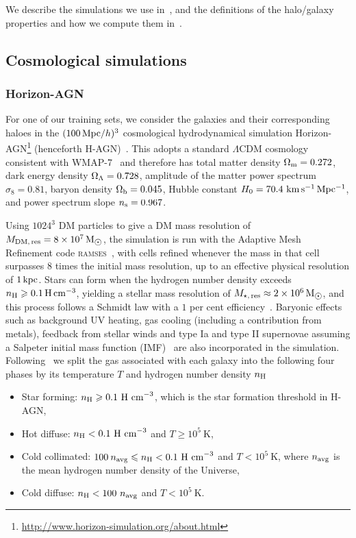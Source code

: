\documentclass[usenatbib,useAMS]{mnras}
\begin{document}
We describe the simulations we use in~, and the definitions of the halo/galaxy properties and how we compute them in~.


\subsection{Cosmological simulations}\label{sec:Cosmological simulations}

\subsubsection{Horizon-AGN}\label{sec:HAGN_simulation}

For one of our training sets, we consider the galaxies and their corresponding haloes in the $(100 {\rm \, Mpc}/h)^3$ cosmological hydrodynamical simulation Horizon-AGN\footnote{\url{http://www.horizon-simulation.org/about.html}} (henceforth H-AGN)~\citep{Dubois_2014}. This adopts a standard $\Lambda$CDM cosmology consistent with WMAP-7~\citep{Komatsu_2011} and therefore has total matter density $\Omega_{\rm m} = 0.272$, dark energy density $\Omega_{\rm \Lambda} = 0.728$, amplitude of the matter power spectrum $\sigma_8 = 0.81$, baryon density $\Omega_{\rm b} = 0.045$, Hubble constant $H_0 = 70.4 \, {\rm \, km \, s^{-1} \, Mpc^{-1}}$, and power spectrum slope $n_{\rm s} = 0.967$.

Using $1024^3$ \ac{DM} particles to give a \ac{DM} mass resolution of $M_{\rm DM, \, res} = 8 \times 10^7 {\rm \, M_{\sun}}$, the simulation is run with the Adaptive Mesh Refinement code \textsc{ramses}~\citep{Teyssier_2002}, with cells refined whenever the mass in that cell surpasses 8 times the initial mass resolution, up to an effective physical resolution of $1{\rm \, kpc}$. Stars can form when the hydrogen number density exceeds $n_{\rm H} \geq 0.1 {\rm \, H \, cm^{-3}}$, yielding a stellar mass resolution of $M_{\rm \star, \, res} \approx 2 \times 10^6 {\rm \, M_{\sun}}$, and this process follows a Schmidt law with a $1$ per cent efficiency~\citep{Rasera_2006}. Baryonic effects such as background UV heating, gas cooling (including a contribution from metals), feedback from stellar winds and type Ia and type II supernovae assuming a Salpeter initial mass function (IMF)~\citep{Dubois_2008,taysun2012a} are also incorporated in the simulation. Following~\cite{Dubois_2013} we split the gas associated with each galaxy into the following four phases by its temperature $T$ and hydrogen number density $n_{\rm H}$
% 
\begin{itemize}
    \item Star forming: $n_{\rm H} \geq 0.1~\mathrm{H~cm}^{-3}$, which is the star formation threshold in H-AGN,
    \item Hot diffuse: $n_{\rm H} < 0.1~\mathrm{H~cm}^{-3}$ and $T\geq 10^5~\mathrm{K}$,
    \item Cold collimated: $100 \: n_{\rm avg} \leq n_{\rm H} < 0.1~\mathrm{H~cm}^{-3}$ and $T < 10^5~\mathrm{K}$, where $n_{\rm avg}$ is the mean hydrogen number density of the Universe,
    \item Cold diffuse: $n_{\rm H} < 100~n_{\rm avg}$ and $T < 10^5~\mathrm{K}$.
\end{itemize}
\end{document}
